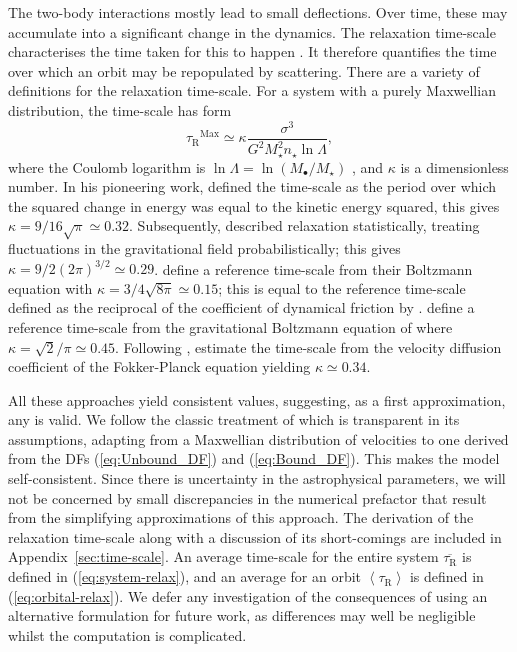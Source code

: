 \documentclass[useAMS,usedcolumn,usegraphicx,usenatbib]{mn2e}
\newcommand{\eqnref}[1]{(\ref{eq:#1})}
\newcommand{\apref}[1]{Appendix~\ref{sec:#1}}
\newcommand{\sub}[1]{\ensuremath{_\mathrm{#1}}}
\newcommand{\super}[1]{\ensuremath{^\mathrm{#1}}}
\begin{document}
The two-body interactions mostly lead to small deflections. Over time, these may accumulate into a significant change in the dynamics. The relaxation time-scale characterises the time taken for this to happen \citep[section 1.2.1]{Binney2008}. It therefore quantifies the time over which an orbit may be repopulated by scattering. There are a variety of definitions for the relaxation time-scale. For a system with a purely Maxwellian distribution, the time-scale has form
\begin{equation}
\tau\sub{R}\super{Max} \simeq \kappa\frac{\sigma^3}{G^2M_\star^2 n_\star\ln\Lambda},
\label{eq:tauMaxwell}
\end{equation}
where the Coulomb logarithm is $\ln\Lambda = \ln(M_\bullet/M_\star)$ \citep{Bahcall1976}, and $\kappa$ is a dimensionless number. In his pioneering work, \citet{Chandrasekhar1941, Chandrasekhar1960} defined the time-scale as the period over which the squared change in energy was equal to the kinetic energy squared, this gives $\kappa = 9/16\sqrt{\pi} \simeq 0.32$. Subsequently, \citet{Chandrasekhar1941a} described relaxation statistically, treating fluctuations in the gravitational field probabilistically; this gives $\kappa = 9/2(2\pi)^{3/2} \simeq 0.29$. \citet{Bahcall1977} define a reference time-scale from their Boltzmann equation with $\kappa = 3/4\sqrt{8\pi} \simeq 0.15$; this is equal to the reference time-scale defined as the reciprocal of the coefficient of dynamical friction by \citet{Chandrasekhar1943a, Chandrasekhar1943}. \citet{Spitzer1958} define a reference time-scale from the gravitational Boltzmann equation of \citet{Spitzer1951} where $\kappa = \sqrt{2}/\pi \simeq 0.45$. Following \citet{Spitzer1971}, \citet[section 7.4.5]{Binney2008} estimate the time-scale from the velocity diffusion coefficient of the Fokker-Planck equation yielding $\kappa \simeq 0.34$.

All these approaches yield consistent values, suggesting, as a first approximation, any is valid. We follow the classic treatment of \citet[chapter 2]{Chandrasekhar1960} which is transparent in its assumptions, adapting from a Maxwellian distribution of velocities to one derived from the DFs \eqnref{Unbound_DF} and \eqnref{Bound_DF}. This makes the model self-consistent. Since there is uncertainty in the astrophysical parameters, we will not be concerned by small discrepancies in the numerical prefactor that result from the simplifying approximations of this approach. The derivation of the relaxation time-scale along with a discussion of its short-comings are included in \apref{time-scale}. An average time-scale for the entire system $\overline{\tau\sub{R}}$ is defined in \eqnref{system-relax}, and an average for an orbit $\left\langle\tau\sub{R}\right\rangle$ is defined in \eqnref{orbital-relax}. We defer any investigation of the consequences of using an alternative formulation for future work, as differences may well be negligible whilst the computation is complicated.
\end{document}
